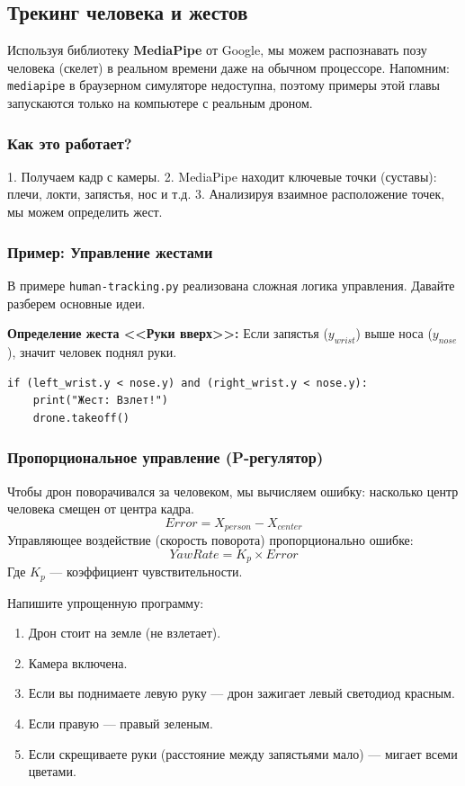 \subsection{Трекинг человека и жестов}

Используя библиотеку \textbf{MediaPipe} от Google, мы можем распознавать позу человека (скелет) в реальном времени даже на обычном процессоре. Напомним: \texttt{mediapipe} в браузерном симуляторе недоступна, поэтому примеры этой главы запускаются только на компьютере с реальным дроном.

\subsubsection*{Как это работает?}
1. Получаем кадр с камеры.
2. MediaPipe находит ключевые точки (суставы): плечи, локти, запястья, нос и т.д.
3. Анализируя взаимное расположение точек, мы можем определить жест.

\subsubsection*{Пример: Управление жестами}
В примере \texttt{human-tracking.py} реализована сложная логика управления. Давайте разберем основные идеи.

\textbf{Определение жеста <<Руки вверх>>:}
Если запястья ($y_{wrist}$) выше носа ($y_{nose}$), значит человек поднял руки.

\begin{codebox}
\begin{verbatim}
if (left_wrist.y < nose.y) and (right_wrist.y < nose.y):
    print("Жест: Взлет!")
    drone.takeoff()
\end{verbatim}
\end{codebox}

\subsubsection*{Пропорциональное управление (P-регулятор)}
Чтобы дрон поворачивался за человеком, мы вычисляем ошибку: насколько центр человека смещен от центра кадра.
$$ Error = X_{person} - X_{center} $$
Управляющее воздействие (скорость поворота) пропорционально ошибке:
$$ YawRate = K_p \times Error $$
Где $K_p$ — коэффициент чувствительности.

\begin{taskbox}[Джедай]
Напишите упрощенную программу:
\begin{enumerate}
    \item Дрон стоит на земле (не взлетает).
    \item Камера включена.
    \item Если вы поднимаете левую руку — дрон зажигает левый светодиод красным.
    \item Если правую — правый зеленым.
    \item Если скрещиваете руки (расстояние между запястьями мало) — мигает всеми цветами.
\end{enumerate}
\end{taskbox}
